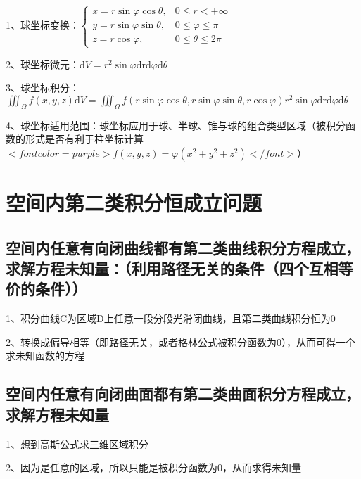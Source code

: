 1、球坐标变换：$ \begin{cases}x=r \sin \varphi \cos \theta, & 0 \leqslant r<+\infty \\ y=r \sin \varphi \sin \theta, & 0 \leqslant \varphi \leqslant \pi \\ z=r \cos \varphi, & 0 \leqslant \theta \leqslant 2 \pi\end{cases} $

2、球坐标微元：$ \mathrm{d} V=r^{2} \sin \varphi \mathrm{drd} \varphi \mathrm{d} \theta $

3、球坐标积分：$ \iiint_{\Omega} f(x, y, z) \mathrm{d} V=\iiint_{\Omega} f(r \sin \varphi \cos \theta, r \sin \varphi \sin \theta, r \cos \varphi) r^{2} \sin \varphi \mathrm{drd} \varphi \mathrm{d} \theta $

4、球坐标适用范围：球坐标应用于球、半球、锥与球的组合类型区域（被积分函数的形式是否有利于柱坐标计算$ <font color=purple>f(x, y, z)=\varphi\left(x^{2}+y^{2}+z^{2}\right)</font> $）

\section{空间内第二类积分恒成立问题}



\subsection{空间内任意有向闭曲线都有第二类曲线积分方程成立，求解方程未知量：（利用路径无关的条件（四个互相等价的条件））}

1、积分曲线C为区域D上任意一段分段光滑闭曲线，且第二类曲线积分恒为0

2、转换成偏导相等（即路径无关，或者格林公式被积分函数为0），从而可得一个求未知函数的方程



\subsection{空间内任意有向闭曲面都有第二类曲面积分方程成立，求解方程未知量}

1、想到高斯公式求三维区域积分

2、因为是任意的区域，所以只能是被积分函数为0，从而求得未知量



